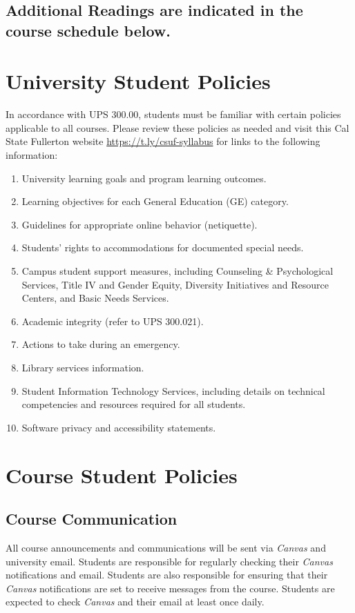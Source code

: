 \documentclass[12pt, letterpaper]{article}
\begin{document}
\subsection*{Additional Readings are indicated in the course schedule below.}

\section{University Student Policies}

In accordance with UPS 300.00, students must be familiar with certain policies applicable to all courses. Please review these policies as needed and visit this Cal State Fullerton website \href{https://t.ly/csuf-syllabus}{https://t.ly/csuf-syllabus} for links to the following information:

\begin{enumerate}
    \item   University learning goals and program learning outcomes.
    \item	Learning objectives for each General Education (GE) category.
    \item	Guidelines for appropriate online behavior (netiquette).
    \item	Students’ rights to accommodations for documented special needs.
    \item   Campus student support measures, including Counseling \& Psychological Services, Title IV and Gender Equity, Diversity Initiatives and Resource Centers, and Basic Needs Services.
    \item	Academic integrity (refer to UPS 300.021).
    \item	Actions to take during an emergency.
    \item	Library services information.
    \item	Student Information Technology Services, including details on technical competencies and resources required for all students.
    \item	Software privacy and accessibility statements.
\end{enumerate}

\section{Course Student Policies}

\subsection*{Course Communication}
All course announcements and communications will be sent via \emph{Canvas} and university email. Students are responsible for regularly checking their \emph{Canvas} notifications and email. Students are also responsible for ensuring that their \emph{Canvas} notifications are set to receive messages from the course. Students are expected to check \emph{Canvas} and their email at least once daily.
\end{document}
